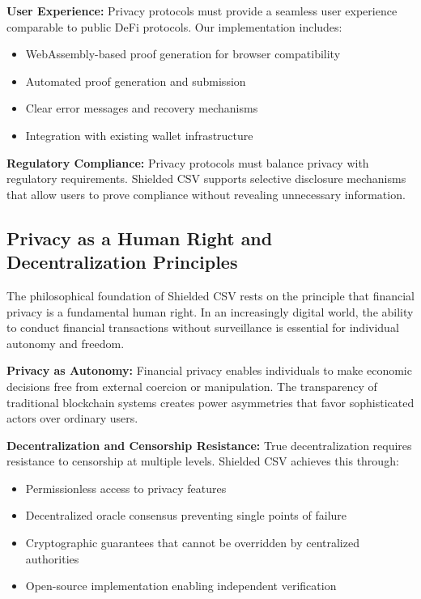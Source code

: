 \documentclass[11pt,a4paper]{article}
\begin{document}
\textbf{User Experience:} Privacy protocols must provide a seamless user experience comparable to public DeFi protocols. Our implementation includes:
\begin{itemize}
    \item WebAssembly-based proof generation for browser compatibility
    \item Automated proof generation and submission
    \item Clear error messages and recovery mechanisms
    \item Integration with existing wallet infrastructure
\end{itemize}

\textbf{Regulatory Compliance:} Privacy protocols must balance privacy with regulatory requirements. Shielded CSV supports selective disclosure mechanisms that allow users to prove compliance without revealing unnecessary information.

\subsection{Privacy as a Human Right and Decentralization Principles}

The philosophical foundation of Shielded CSV rests on the principle that financial privacy is a fundamental human right. In an increasingly digital world, the ability to conduct financial transactions without surveillance is essential for individual autonomy and freedom.

\textbf{Privacy as Autonomy:} Financial privacy enables individuals to make economic decisions free from external coercion or manipulation. The transparency of traditional blockchain systems creates power asymmetries that favor sophisticated actors over ordinary users.

\textbf{Decentralization and Censorship Resistance:} True decentralization requires resistance to censorship at multiple levels. Shielded CSV achieves this through:
\begin{itemize}
    \item Permissionless access to privacy features
    \item Decentralized oracle consensus preventing single points of failure
    \item Cryptographic guarantees that cannot be overridden by centralized authorities
    \item Open-source implementation enabling independent verification
\end{itemize}
\end{document}

